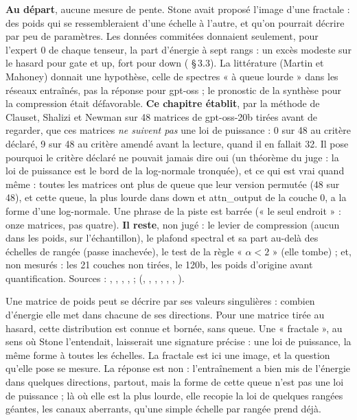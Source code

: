 \begin{origine}
\textbf{Au départ}, aucune mesure de pente. Stone avait proposé l'image d'une fractale : des poids qui se ressembleraient d'une échelle à l'autre, et qu'on pourrait décrire par peu de paramètres. Les données commitées donnaient seulement, pour l'expert 0 de chaque tenseur, la part d'énergie à sept rangs : un excès modeste sur le hasard pour gate et up, fort pour down ( §\,3.3). La littérature (Martin et Mahoney) donnait une hypothèse, celle de spectres « à queue lourde » dans les réseaux entraînés, pas la réponse pour gpt-oss ; le pronostic de la synthèse pour la compression était défavorable.
\textbf{Ce chapitre établit}, par la méthode de Clauset, Shalizi et Newman sur 48 matrices de gpt-oss-20b tirées avant de regarder, que ces matrices \emph{ne suivent pas} une loi de puissance : 0 sur 48 au critère déclaré, 9 sur 48 au critère amendé avant la lecture, quand il en fallait 32. Il pose pourquoi le critère déclaré ne pouvait jamais dire oui (un théorème du juge : la loi de puissance est le bord de la log-normale tronquée), et ce qui est vrai quand même : toutes les matrices ont plus de queue que leur version permutée (48 sur 48), et cette queue, la plus lourde dans down et attn\_output de la couche 0, a la forme d'une log-normale. Une phrase de la piste est barrée (« le seul endroit » : onze matrices, pas quatre).
\textbf{Il reste}, non jugé : le levier de compression (aucun dans les poids, sur l'échantillon), le plafond spectral et sa part au-delà des échelles de rangée (passe inachevée), le test de la règle « $\hat\alpha < 2$ » (elle tombe) ; et, non mesurés : les 21 couches non tirées, le 120b, les poids d'origine avant quantification.
Sources : , , , ,  ;  (, , , , , , ).
\end{origine}

\begin{enbref}
Une matrice de poids peut se décrire par ses valeurs singulières : combien d'énergie elle met dans chacune de ses directions. Pour une matrice tirée au hasard, cette distribution est connue et bornée, sans queue. Une « fractale », au sens où Stone l'entendait, laisserait une signature précise : une loi de puissance, la même forme à toutes les échelles. La fractale est ici une image, et la question qu'elle pose se mesure. La réponse est non : l'entraînement a bien mis de l'énergie dans quelques directions, partout, mais la forme de cette queue n'est pas une loi de puissance ; là où elle est la plus lourde, elle recopie la loi de quelques rangées géantes, les canaux aberrants, qu'une simple échelle par rangée prend déjà.
\end{enbref}


